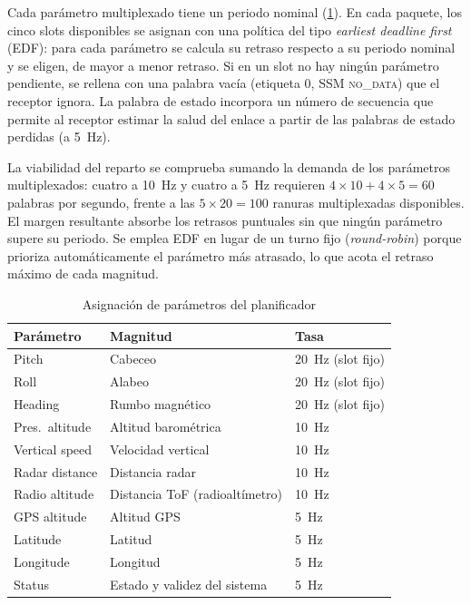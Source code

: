 Cada parámetro multiplexado tiene un periodo nominal (\cref{tab:scheduler_assignment}).
En cada paquete, los cinco slots disponibles se asignan con una política del
tipo \textit{earliest deadline first} (EDF): para cada parámetro se calcula su
retraso respecto a su periodo nominal y se eligen, de mayor a menor retraso. Si en un slot no hay ningún parámetro pendiente, se rellena
con una palabra vacía (etiqueta 0, SSM \textsc{no\_data}) que el receptor
ignora. La palabra de estado incorpora un número de secuencia que permite al
receptor estimar la salud del enlace a partir de las palabras de estado perdidas
(a \SI{5}{\hertz}).

La viabilidad del reparto se comprueba sumando la demanda de los parámetros
multiplexados: cuatro a \SI{10}{\hertz} y cuatro a \SI{5}{\hertz} requieren
$4\times10 + 4\times5 = \num{60}$ palabras por segundo, frente a las
$5\times20 = \num{100}$ ranuras multiplexadas disponibles. El margen resultante
absorbe los retrasos puntuales sin que ningún parámetro supere su periodo. Se
emplea EDF en lugar de un turno fijo (\textit{round-robin}) porque prioriza
automáticamente el parámetro más atrasado, lo que acota el retraso máximo de cada
magnitud.

\begin{table}[H]
    \centering
    \caption{Asignación de parámetros del planificador}
    \label{tab:scheduler_assignment}
    \begin{tabularx}{\linewidth}{l X l}
        \toprule
        \textbf{Parámetro} & \textbf{Magnitud} & \textbf{Tasa} \\
        \midrule
        Pitch & Cabeceo & \SI{20}{\hertz} (slot fijo) \\
        Roll & Alabeo & \SI{20}{\hertz} (slot fijo) \\
        Heading & Rumbo magnético & \SI{20}{\hertz} (slot fijo) \\
        \midrule
        Pres.~altitude & Altitud barométrica & \SI{10}{\hertz} \\
        Vertical speed & Velocidad vertical & \SI{10}{\hertz} \\
        Radar distance & Distancia radar & \SI{10}{\hertz} \\
        Radio altitude & Distancia ToF (radioaltímetro) & \SI{10}{\hertz} \\
        \midrule
        GPS altitude & Altitud GPS & \SI{5}{\hertz} \\
        Latitude & Latitud & \SI{5}{\hertz} \\
        Longitude & Longitud & \SI{5}{\hertz} \\
        Status & Estado y validez del sistema & \SI{5}{\hertz} \\
        \bottomrule
    \end{tabularx}
\end{table}


